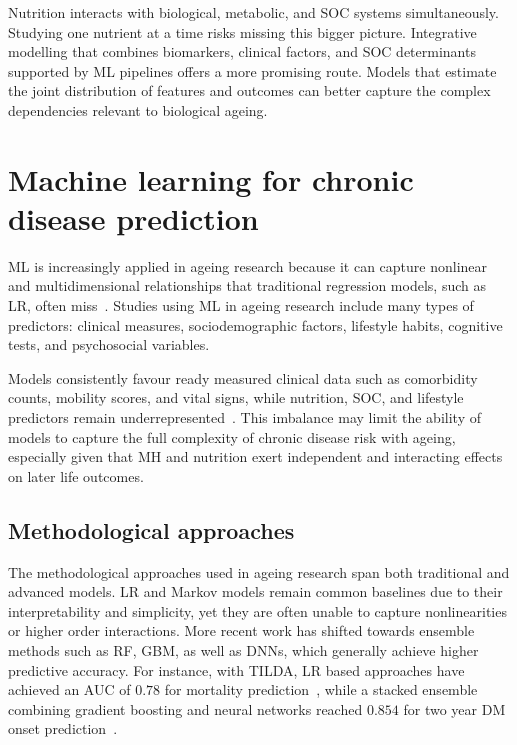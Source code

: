Nutrition interacts with biological, metabolic, and \gls{SOC} systems simultaneously. Studying one nutrient at a time risks missing this bigger picture. Integrative modelling that combines biomarkers, clinical factors, and \gls{SOC} determinants supported by \gls{ML} pipelines offers a more promising route. Models that estimate the joint distribution of features and outcomes can better capture the complex dependencies relevant to biological ageing.

\section{Machine learning for chronic disease prediction}
\gls{ML} is increasingly applied in ageing research because it can capture nonlinear and multidimensional relationships that traditional regression models, such as \gls{LR}, often miss~\cite{xuTailoredMachineLearning2023, boyleBrainpredictedAgeDifference2021}. Studies using \gls{ML} in ageing research include many types of predictors: clinical measures, sociodemographic factors, lifestyle habits, cognitive tests, and psychosocial variables. 

Models consistently favour ready measured clinical data such as comorbidity counts, mobility scores, and vital signs, while nutrition, \gls{SOC}, and lifestyle predictors remain underrepresented~\cite{xuTailoredMachineLearning2023,moguilnerImportanceAgePrediction2021}.
This imbalance may limit the ability of models to capture the full complexity of chronic disease risk with ageing, especially given that \gls{MH} and nutrition exert independent and interacting effects on later life outcomes.

\subsection{Methodological approaches}
The methodological approaches used in ageing research span both traditional and advanced models. 
\gls{LR} and Markov models remain common baselines due to their interpretability and simplicity, yet they are often unable to capture nonlinearities or higher order interactions. 
More recent work has shifted towards ensemble methods such as \gls{RF}, \gls{GBM}, as well as \gls{DNN}s, which generally achieve higher predictive accuracy. For instance, with \gls{TILDA}, \gls{LR} based approaches have achieved an \gls{AUC} of $0.78$ for mortality prediction~\cite{matthewsPredictingMortalityIrish2022}, while a stacked ensemble combining gradient boosting and neural networks reached $0.854$ for two year \gls{DM} onset prediction~\cite{xuTailoredMachineLearning2023}.

